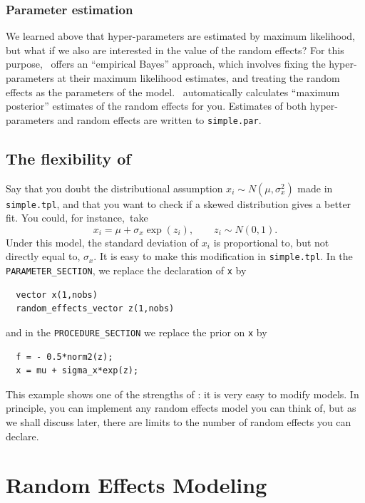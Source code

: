 \documentclass{admbmanual}
\begin{document}
\subsection{Parameter estimation}

We learned above that hyper-parameters are estimated by maximum likelihood, but what if we also are interested
in the value of the random effects? For this purpose, \scAR\ offers an ``empirical Bayes'' approach, which
involves fixing the hyper-parameters at their maximum likelihood estimates, and treating the random effects as
the parameters of the model. \scAR\ automatically calculates ``maximum posterior'' estimates of the random
effects for you. Estimates of both hyper-parameters and random effects are written to \texttt{simple.par}.


\section{The flexibility of \scAR\label{lognormal}}

Say that you doubt the distributional assumption $x_i\sim N(\mu ,\sigma _{x}^{2})$ made in
\texttt{simple.tpl}, and that you want to check if a skewed distribution gives a better fit. You could, for
instance,~take
\[
x_i=\mu +\sigma_{x}\exp (z_i),\qquad z_i\sim N(0,1).
\]
Under this model, the standard deviation of $x_i$ is proportional to, but not directly equal to, $\sigma_{x}$. It is
easy to make this modification in \texttt{simple.tpl}. In the \texttt{PARAMETER\_SECTION}, we replace the
    declaration of \texttt{x} by
\begin{lstlisting}
  vector x(1,nobs)
  random_effects_vector z(1,nobs)
\end{lstlisting}
and in the \texttt{PROCEDURE\_SECTION} we replace the prior on \texttt{x} by
\begin{lstlisting}
  f = - 0.5*norm2(z);
  x = mu + sigma_x*exp(z);
\end{lstlisting}

This example shows one of the strengths of \scAR: it is very easy to
modify models. In principle, you can implement any random effects model you
can think of, but as we shall discuss later, there are limits to the number
of random effects you can declare.


\chapter{Random Effects Modeling}
\label{ch:random-effects-modeling}
\end{document}
